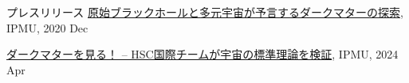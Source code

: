\begin{rSection}{プレスリリース}
    \href{https://www.ipmu.jp/ja/20201224-PBH-multiverse}{原始ブラックホールと多元宇宙が予言するダークマターの探索}, IPMU, 2020 Dec
  
    \href{https://www.ipmu.jp/ja/20230404-darkmatter}{ダークマターを見る！ – HSC国際チームが宇宙の標準理論を検証}, IPMU, 2024 Apr
\end{rSection}
